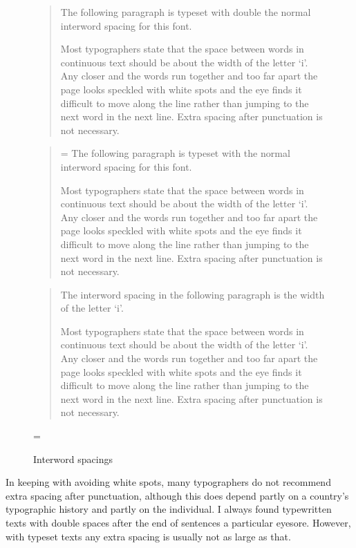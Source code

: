 \documentclass[10pt,letterpaper]{memoir}
\begin{document}
\setlength{\unitlength}{\fontdimen2\font}
\begin{figure}
\centering
\begin{minipage}{\textwidth}
\mbox{}\hrulefill\mbox{}
\begin{quotation}
\font
    The following paragraph is typeset with double the normal interword 
spacing for this font.

    Most typographers state that the space between words in continuous
text should be about the width of the letter `i'. Any closer and the
words run together and too far apart the page looks speckled with white
spots and the eye finds it difficult to move along the line rather than
jumping to the next word in the next line. 
Extra spacing after punctuation is not necessary.
\end{quotation}
\begin{quotation}
\font=\unitlength
    The following paragraph is typeset with the normal interword spacing 
for this font.

    Most typographers state that the space between words in continuous
text should be about the width of the letter `i'. Any closer and the
words run together and too far apart the page looks speckled with white
spots and the eye finds it difficult to move along the line rather than
jumping to the next word in the next line. 
Extra spacing after punctuation is not necessary.
\end{quotation}
\begin{quotation}
\settowidth{\fontdimen2\font}{i}
    The interword spacing in the following paragraph is the width 
of the letter `i'.
 
    Most typographers state that the space between words in continuous
text should be about the width of the letter `i'. Any closer and the
words run together and too far apart the page looks speckled with white
spots and the eye finds it difficult to move along the line rather than
jumping to the next word in the next line. 
Extra spacing after punctuation is not necessary.
\end{quotation}
\mbox{}\hrulefill\mbox{}
\end{minipage}
\font=\unitlength \setlength{\unitlength}{1pt}
\caption{Interword spacings}\label{fig:interword}
\end{figure}

    In keeping with avoiding white spots, many typographers do not
recommend extra spacing after punctuation, although this does depend
partly on a country's typographic history and partly on the individual.
I always found typewritten texts with double spaces after the end
of sentences a particular eyesore. However, with typeset texts any 
extra spacing is usually not as large as that.
\end{document}
